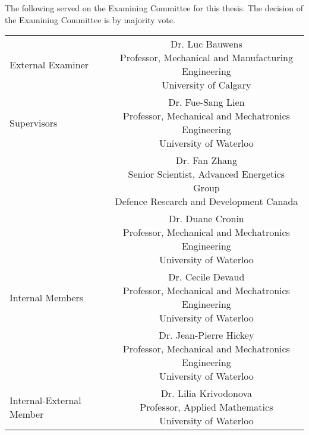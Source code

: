 \maketitle
\begin{committee}
    \noindent
    The following served on the Examining Committee for this thesis. The decision of the Examining Committee is by majority vote.

    \begin{center}
        \setlength{\tabcolsep}{10pt}%
        \renewcommand{\arraystretch}{3}%
        \begin{tabular}{lc}
            External Examiner & \parbox[t]{10cm}{Dr. Luc Bauwens\\Professor, Mechanical and Manufacturing Engineering\\University of 
Calgary}\\
            Supervisors & \parbox[t]{10cm}{Dr. Fue-Sang Lien\\Professor, Mechanical and Mechatronics Engineering\\University of Waterloo}\\
             & \parbox[t]{10cm}{Dr. Fan Zhang\\Senior Scientist, Advanced Energetics Group\\Defence Research and Development Canada}\\
             & \parbox[t]{10cm}{Dr. Duane Cronin\\Professor, Mechanical and Mechatronics Engineering\\University of Waterloo}\\
            Internal Members & \parbox[t]{10cm}{Dr. Cecile Devaud\\Professor, Mechanical and Mechatronics Engineering\\University of Waterloo}\\
             & \parbox[t]{10cm}{Dr. Jean-Pierre Hickey\\Professor, Mechanical and Mechatronics Engineering\\University of Waterloo}\\
            Internal-External Member & \parbox[t]{10cm}{Dr. Lilia Krivodonova\\Professor, Applied Mathematics\\University of Waterloo}\\
        \end{tabular}
    \end{center}
\end{committee}
